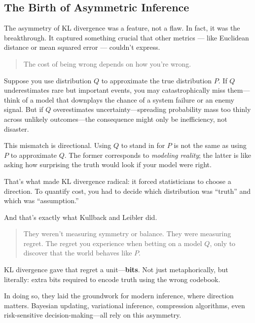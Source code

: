 \subsection{The Birth of Asymmetric Inference}

The asymmetry of KL divergence was a feature, not a flaw. In fact, it was the breakthrough. It captured something crucial that other metrics --- like Euclidean distance or mean squared error --- couldn’t express. 

\begin{quote}
The cost of being wrong depends on how you’re wrong.
\end{quote}

Suppose you use distribution \( Q \) to approximate the true distribution \( P \). If \( Q \) underestimates rare but important events, you may catastrophically miss them—think of a model that downplays the chance of a system failure or an enemy signal. But if \( Q \) overestimates uncertainty—spreading probability mass too thinly across unlikely outcomes—the consequence might only be inefficiency, not disaster. 

This mismatch is directional. Using \( Q \) to stand in for \( P \) is not the same as using \( P \) to approximate \( Q \). The former corresponds to \textit{modeling reality}; the latter is like asking how surprising the truth would look if your model were right.

That’s what made KL divergence radical: it forced statisticians to choose a direction. To quantify cost, you had to decide which distribution was “truth” and which was “assumption.”

And that’s exactly what Kullback and Leibler did.

\vspace{1em}

\begin{quote}
They weren’t measuring symmetry or balance. They were measuring regret.  The regret you experience when betting on a model \( Q \), only to discover that the world behaves like \( P \). 
\end{quote}

KL divergence gave that regret a unit—\textbf{bits}. Not just metaphorically, but literally: extra bits required to encode truth using the wrong codebook.

In doing so, they laid the groundwork for modern inference, where direction matters. Bayesian updating, variational inference, compression algorithms, even risk-sensitive decision-making—all rely on this asymmetry.

